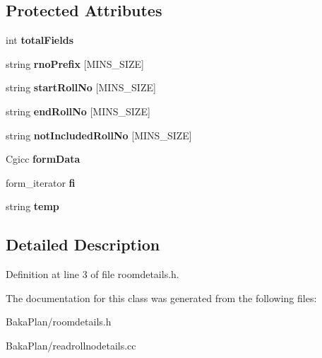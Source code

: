 \subsection*{Protected Attributes}
\begin{DoxyCompactItemize}
\item 
\hypertarget{classReadRollNoDetails_a9e3da16b31935dc91fec7c5c9fe5b0b1}{int {\bfseries total\-Fields}}\label{classReadRollNoDetails_a9e3da16b31935dc91fec7c5c9fe5b0b1}

\item 
\hypertarget{classReadRollNoDetails_a3ce491bf8fbdc887b3fc2c1d9bab03f6}{string {\bfseries rno\-Prefix} \mbox{[}M\-I\-N\-S\-\_\-\-S\-I\-Z\-E\mbox{]}}\label{classReadRollNoDetails_a3ce491bf8fbdc887b3fc2c1d9bab03f6}

\item 
\hypertarget{classReadRollNoDetails_a40301d363dead62c878a501f6cc13f3c}{string {\bfseries start\-Roll\-No} \mbox{[}M\-I\-N\-S\-\_\-\-S\-I\-Z\-E\mbox{]}}\label{classReadRollNoDetails_a40301d363dead62c878a501f6cc13f3c}

\item 
\hypertarget{classReadRollNoDetails_a165f0453148ac33fc3d42a0749c1e3d2}{string {\bfseries end\-Roll\-No} \mbox{[}M\-I\-N\-S\-\_\-\-S\-I\-Z\-E\mbox{]}}\label{classReadRollNoDetails_a165f0453148ac33fc3d42a0749c1e3d2}

\item 
\hypertarget{classReadRollNoDetails_add8c46be1edcce9f5d03d0a738d90682}{string {\bfseries not\-Included\-Roll\-No} \mbox{[}M\-I\-N\-S\-\_\-\-S\-I\-Z\-E\mbox{]}}\label{classReadRollNoDetails_add8c46be1edcce9f5d03d0a738d90682}

\item 
\hypertarget{classReadRollNoDetails_ac821611109cf5b331fa827c6c0814176}{Cgicc {\bfseries form\-Data}}\label{classReadRollNoDetails_ac821611109cf5b331fa827c6c0814176}

\item 
\hypertarget{classReadRollNoDetails_a993462dcd9f13d5ab4d0ac41ce58c2c0}{form\-\_\-iterator {\bfseries fi}}\label{classReadRollNoDetails_a993462dcd9f13d5ab4d0ac41ce58c2c0}

\item 
\hypertarget{classReadRollNoDetails_ad362d259f2383fa1c0ee6aef9399b613}{string {\bfseries temp}}\label{classReadRollNoDetails_ad362d259f2383fa1c0ee6aef9399b613}

\end{DoxyCompactItemize}


\subsection{Detailed Description}


Definition at line 3 of file roomdetails.\-h.



The documentation for this class was generated from the following files\-:\begin{DoxyCompactItemize}
\item 
Baka\-Plan/roomdetails.\-h\item 
Baka\-Plan/readrollnodetails.\-cc\end{DoxyCompactItemize}
